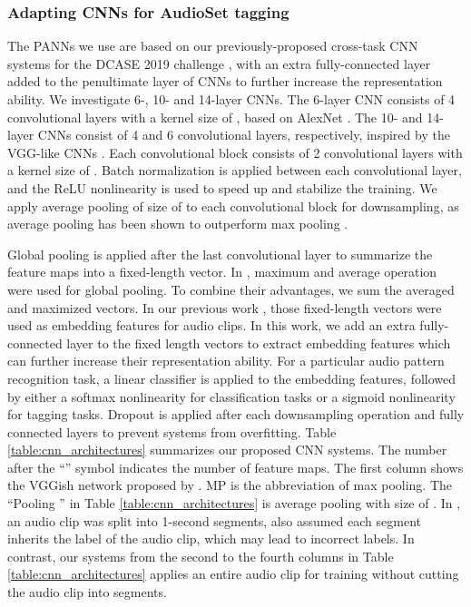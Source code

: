 \documentclass[journal]{IEEEtran}
\begin{document}
\subsubsection{Adapting CNNs for AudioSet tagging}
The PANNs we use are based on our previously-proposed cross-task CNN systems for the DCASE 2019 challenge \cite{kong2019cross}, with an extra fully-connected layer added to the penultimate layer of CNNs to further increase the representation ability. We investigate 6-, 10- and 14-layer CNNs. The 6-layer CNN consists of 4 convolutional layers with a kernel size of , based on AlexNet \cite{krizhevsky2012imagenet}. The 10- and 14-layer CNNs consist of 4 and 6 convolutional layers, respectively, inspired by the VGG-like CNNs \cite{simonyan2014very}. Each convolutional block consists of 2 convolutional layers with a kernel size of . Batch normalization \cite{ioffe2015batch} is applied between each convolutional layer, and the ReLU nonlinearity \cite{nair2010rectified} is used to speed up and stabilize the training. We apply average pooling of size of  to each convolutional block for downsampling, as  average pooling has been shown to outperform  max pooling \cite{kong2019cross}.

Global pooling is applied after the last convolutional layer to summarize the feature maps into a fixed-length vector. In \cite{pons2017end}, maximum and average operation were used for global pooling. To combine their advantages, we sum the averaged and maximized vectors. In our previous work \cite{kong2019cross}, those fixed-length vectors were used as embedding features for audio clips. In this work, we add an extra fully-connected layer to the fixed length vectors to extract embedding features which can further increase their representation ability. For a particular audio pattern recognition task, a linear classifier is applied to the embedding features, followed by either a softmax nonlinearity for classification tasks or a sigmoid nonlinearity for tagging tasks. Dropout \cite{srivastava2014dropout} is applied after each downsampling operation and fully connected layers to prevent systems from overfitting. Table \ref{table:cnn_architectures} summarizes our proposed CNN systems. The number after the ``'' symbol indicates the number of feature maps. The first column shows the VGGish network proposed by \cite{hershey2017cnn}. MP is the abbreviation of max pooling. The ``Pooling '' in Table \ref{table:cnn_architectures} is average pooling with size of . In \cite{hershey2017cnn}, an audio clip was split into 1-second segments, \cite{hershey2017cnn} also assumed each segment inherits the label of the audio clip, which may lead to incorrect labels. In contrast, our systems from the second to the fourth columns in Table \ref{table:cnn_architectures} applies an entire audio clip for training without cutting the audio clip into segments. 
\end{document}
